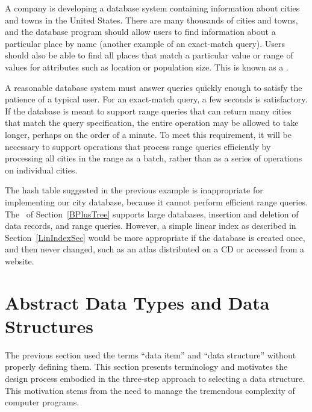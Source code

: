 \begin{example}
\label{CityExamp}
A company is developing a database system containing information about 
cities and towns in the United States.
There are many thousands of cities and towns, and the database program 
should allow users to find information about a particular place by
name (another example of an exact-match query).
Users should also be able to find all places that match a particular
value or range of values for attributes such as location or population
size.
This is known as a .

A reasonable database system must answer queries quickly enough to
satisfy the patience of a typical user.
For an exact-match query, a few seconds is satisfactory.
If the database is meant to support range queries that can return many
cities that match the query specification,
the entire operation may be allowed to take longer, perhaps on the
order of a minute.
To meet this requirement, it will be necessary to support operations
that process range queries efficiently by processing all cities in the
range as a batch, rather than as a series of operations on individual
cities.

The hash table suggested in the previous example is inappropriate for
implementing our city database, because it cannot perform efficient
range queries.
The \BPtree\ of
Section~\ref{BPlusTree}
supports large databases,
insertion and deletion of data records, and range queries.
However, a simple linear index
as described in Section~\ref{LinIndexSec} would be more appropriate if
the database is created once, and then never changed, such as an
atlas distributed on a CD or accessed from a website.
\end{example}

\section{Abstract Data Types and Data Structures}
\label{ADTsec}

The previous section used the terms ``data item'' and
``data structure'' without properly defining them.
This section presents terminology and motivates the design
process embodied in the three-step approach to selecting a data
structure.
This motivation stems from the need to manage the tremendous
complexity of computer programs.

